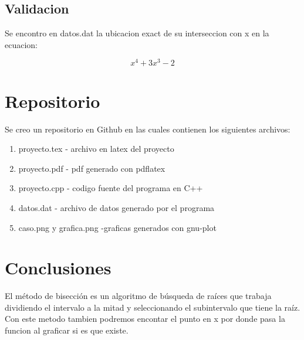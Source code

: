 \documentclass[11pt]{article}
\begin{document}
\subsection{Validacion}

Se encontro en datos.dat la ubicacion exact de su interseccion con x en la ecuacion: 

\begin{equation*}
  x^4+3x^3-2
\end{equation*}
\clearpage
\section{Repositorio}

Se creo un repositorio en Github en las cuales contienen los siguientes archivos:


\begin{enumerate}
  \item proyecto.tex - archivo en latex del proyecto
  \item proyecto.pdf - pdf generado con pdflatex
  \item proyecto.cpp - codigo fuente del programa en C++
  \item datos.dat - archivo de datos generado por el programa
  \item caso.png y grafica.png -graficas generados con gnu-plot
\end{enumerate}

\section{Conclusiones}
El método de bisección es un algoritmo de búsqueda de raíces que trabaja dividiendo el intervalo a la mitad y seleccionando el subintervalo que tiene la raíz. Con este metodo tambien podremos encontar el punto en x por donde pasa la funcion al graficar si es que existe.
\end{document}
